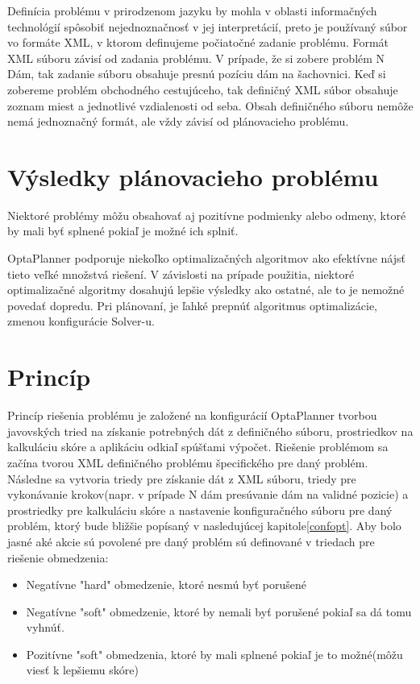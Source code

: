 Definícia problému v prirodzenom jazyku by mohla v oblasti informačných technológií spôsobiť nejednoznačnosť v jej interpretácií, preto je používaný súbor vo formáte XML, v ktorom definujeme počiatočné zadanie problému. Formát XML súboru závisí od zadania problému. V prípade, že si zobere problém N Dám, tak zadanie súboru obsahuje presnú pozíciu dám na šachovnici. Keď si zobereme problém obchodného cestujúceho, tak definičný XML súbor obsahuje zoznam miest a jednotlivé vzdialenosti od seba. Obsah definičného súboru nemôže nemá jednoznačný formát, ale vždy závisí od plánovacieho problému.


\section{Výsledky plánovacieho problému}

Niektoré problémy môžu obsahovať aj pozitívne podmienky alebo odmeny, ktoré by mali byť splnené pokiaľ je možné ich splniť.




OptaPlanner podporuje niekoľko optimalizačných algoritmov ako efektívne nájsť tieto veľké množstvá riešení. V závislosti na prípade použitia, niektoré optimalizačné algoritmy dosahujú lepšie výsledky ako ostatné, ale to je nemožné povedať dopredu. Pri plánovaní, je ľahké prepnúť algoritmus optimalizácie, zmenou konfigurácie Solver-u.



\section{Princíp}
Princíp riešenia problému je založené na konfigurácií OptaPlanner tvorbou javovských tried na získanie potrebných dát z definičného súboru, prostriedkov na kalkuláciu skóre a aplikáciu odkiaľ spúšťami výpočet. Riešenie problémom sa začína tvorou XML definičného problému špecifického pre daný problém. Následne sa vytvoria triedy pre získanie dát z XML súboru, triedy pre vykonávanie krokov(napr. v prípade N dám presúvanie dám na validné pozicie) a prostriedky pre kalkuláciu skóre a nastavenie konfiguračného súboru pre daný problém, ktorý bude bližšie popísaný v nasledujúcej kapitole\ref{confopt}. Aby bolo jasné aké akcie sú povolené pre daný problém sú definované v triedach pre riešenie obmedzenia:
\cite{optabook}
\begin{itemize}
\item Negatívne "hard" obmedzenie, ktoré nesmú byť porušené\label{hardobm}
\item Negatívne "soft" obmedzenie, ktoré by nemali byť porušené pokiaľ sa dá tomu vyhnúť.
\item Pozitívne "soft" obmedzenia, ktoré by mali splnené pokiaľ je to možné(môžu viesť k lepšiemu skóre)
\end{itemize}

